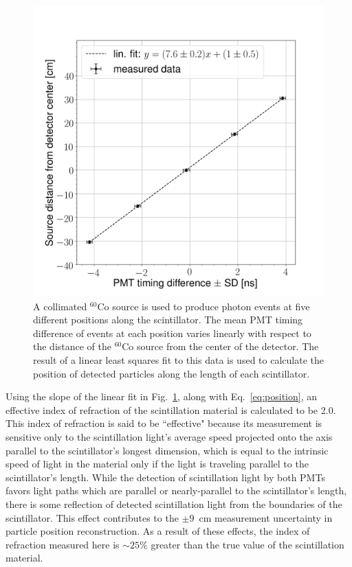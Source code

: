 \begin{figure}[]
    \centering    
    \includegraphics[width = \figsize\textwidth]{PMTDifference.png}
    \caption{
    A collimated $^{60}$Co source is used to produce photon events at five different positions along the scintillator.
    The mean PMT timing difference of events at each position varies linearly with respect to the distance of the $^{60}$Co source from the center of the detector. 
    The result of a linear least squares fit to this data is used to calculate the position of detected particles along the length of each scintillator.
    }
    \label{fig:PMTDifference}
\end{figure}

Using the slope of the linear fit in Fig.~\ref{fig:PMTDifference}, along with Eq.~\ref{eq:position}, an effective index of refraction of the scintillation material is calculated to be 2.0.
This index of refraction is said to be ``effective" because its measurement is sensitive only to the scintillation light's average speed projected onto the axis parallel to the scintillator's longest dimension, which is equal to the intrinsic speed of light in the material only if the light is traveling parallel to the scintillator's length.
While the detection of scintillation light by both PMTs favors light paths which are parallel or nearly-parallel to the scintillator's length, there is some reflection of detected scintillation light from the boundaries of the scintillator.
This effect contributes to the $\pm9$~cm measurement uncertainty in particle position reconstruction.
As a result of these effects, the index of refraction measured here is $\sim{25}\%$ greater than the true value of the scintillation material.  
